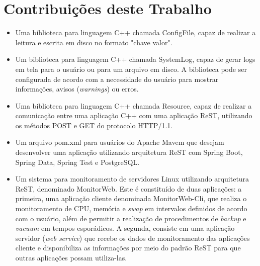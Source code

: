 \section{Contribuições deste Trabalho}
    \begin{itemize}
        \item Uma biblioteca para linguagem C++ chamada ConfigFile, capaz de realizar a leitura e escrita em disco no formato "chave valor".
        
        \item Um biblioteca para linguagem C++ chamada SystemLog, capaz de gerar logs em tela para o usuário ou para um arquivo em disco. A biblioteca pode ser configurada de acordo com a necessidade do usuário para mostrar informações, avisos (\textit{warnings}) ou erros.
        
        \item Uma biblioteca para linguagem C++ chamada Resource, capaz de realizar a comunicação entre uma aplicação C++ com uma aplicação ReST, utilizando os métodos POST e GET do protocolo HTTP/1.1.
        
        \item Um arquivo pom.xml para usuários do Apache Mavem que desejam desenvolver uma aplicação utilizando arquitetura ReST com Spring Boot, Spring Data, Spring Test e PostgreSQL.
        
        \item Um sistema para monitoramento de servidores Linux utilizando arquitetura ReST, denominado MonitorWeb. Este é constituído de duas aplicações: a primeira, uma aplicação cliente denominada MonitorWeb-Cli, que realiza o monitoramento de CPU, memória e \textit{swap} em intervalos definidos de acordo com o usuário, além de permitir a realização de procedimentos de \textit{backup} e \textit{vacuum} em tempos esporádicos. A segunda, consiste em uma aplicação servidor (\textit{web service}) que recebe os dados de monitoramento das aplicações cliente e disponibiliza as informações por meio do padrão ReST para que outras aplicações possam utiliza-las.
    \end{itemize}
    
